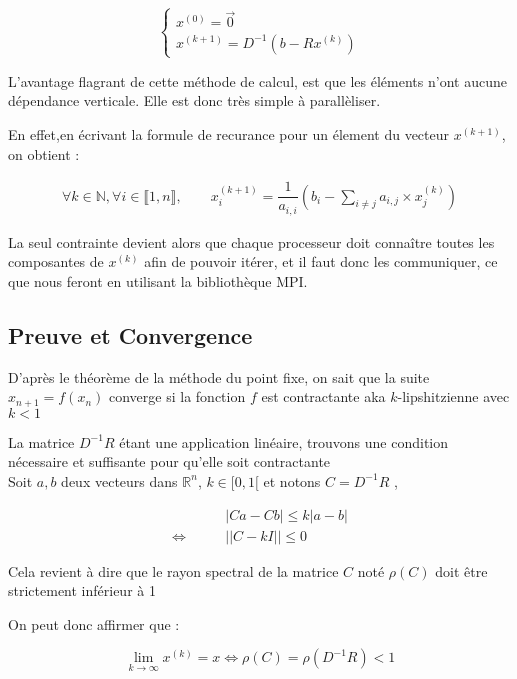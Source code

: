 \documentclass[11pt, a4paper]{article}
\begin{document}
\[
    \left\{
    \begin{array}{l}
        x^{(0)} = \vec{0}\\
        x^{(k+1)} = D^{-1}( b - Rx^{(k)})
    \end{array}
    \right.
\]

L'avantage flagrant de cette méthode de calcul, est que les éléments n'ont aucune dépendance verticale. Elle est donc très simple à parallèliser. 

En effet,en écrivant la formule de recurance pour un élement du vecteur $x^{(k+1)}$, on obtient :

\begin{align}
    \forall k \in \mathbb{N}, \forall i \in \llbracket 1,n \rrbracket, 
    \qquad x_{i}^{(k+1)} = \dfrac{1}{a_{i,i}}(b_i - \sum_{i \neq j}a_{i,j} \times x^{(k)}_j)
\end{align}

La seul contrainte devient alors que chaque processeur doit conna\^itre toutes les composantes de $x^{(k)}$ afin de pouvoir itérer, et il faut donc les communiquer, ce que nous feront en utilisant la bibliothèque MPI.

\subsection{Preuve et Convergence}

D'après le théorème de la méthode du point fixe, on sait que la suite $x_{n+1} = f(x_n)$ converge si la fonction $f$ est contractante aka $k$-lipshitzienne avec $k < 1$

La matrice $D^{-1}R$ étant une application linéaire, trouvons une condition nécessaire et suffisante pour qu'elle soit contractante \\

Soit $a,b$ deux vecteurs dans $\mathbb{R}^n$, $k \in [0,1[$ et notons $C = D^{-1}R$ , 

\begin{align}
    &|Ca - Cb| \leq k|a-b|\\
    \Leftrightarrow \qquad & ||C - kI|| \leq 0
\end{align}

Cela revient à dire que le rayon spectral de la matrice $C$ noté $\rho(C)$ doit \^etre strictement inférieur à 1

On peut donc affirmer que :

\[
\lim_{k \to \infty}x^{(k)} = x \Leftrightarrow \rho(C) = \rho(D^{-1}R) < 1
\]

\newpage 
\end{document}
